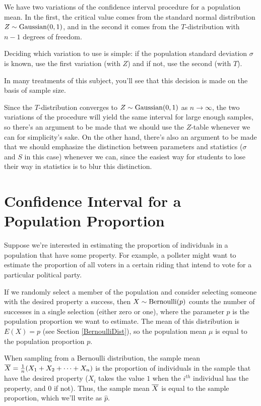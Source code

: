 \begin{keypoint}
We have two variations of the confidence interval procedure for a population mean. In the first, the critical value comes from the standard normal distribution $Z \sim \operatorname{Gaussian}(0,1)$, and in the second it comes from the $T$-distribution with $n-1$ degrees of freedom.

Deciding which variation to use is simple: if the population standard deviation $\sigma$ is known, use the first variation (with $Z$) and if not, use the second (with $T$). 
\end{keypoint}

\begin{remark}
In many treatments of this subject, you'll see that this decision is made on the basis of sample size.

Since the $T$-distribution converges to $Z \sim \operatorname{Gaussian}(0,1)$ as $n \to \infty$, the two variations of the procedure will yield the same interval for large enough samples, so there's an argument to be made that we should use the $Z$-table whenever we can for simplicity's sake. On the other hand, there's also an argument to be made that we should emphasize the distinction between parameters and statistics ($\sigma$ and $S$ in this case) whenever we can, since the easiest way for students to lose their way in statistics is to blur this distinction.
\end{remark}

\section{Confidence Interval for a Population Proportion}

Suppose we're interested in estimating the proportion of individuals in a population that have some property. For example, a pollster might want to estimate the proportion of all voters in a certain riding that intend to vote for a particular political party.

If we randomly select a member of the population and consider selecting someone with the desired property a success, then $X \sim \operatorname{Bernoulli}(p)$ counts the number of successes in a single selection (either zero or one), where the parameter $p$ is the population proportion we want to estimate. The mean of this distribution is $E(X) = p$ (see Section \ref{BernoulliDist}), so the population mean $\mu$ is equal to the population proportion $p$.

When sampling from a Bernoulli distribution, the sample mean ${\overline{X}} = \frac{1}{n}(X_1+X_2+\cdots+X_n)$ is the proportion of individuals in the sample that have the desired property ($X_i$ takes the value $1$ when the $i^{th}$ individual has the property, and $0$ if not). Thus, the sample mean ${\overline{X}}$ is equal to the sample proportion, which we'll write as $\widehat{p}$.

